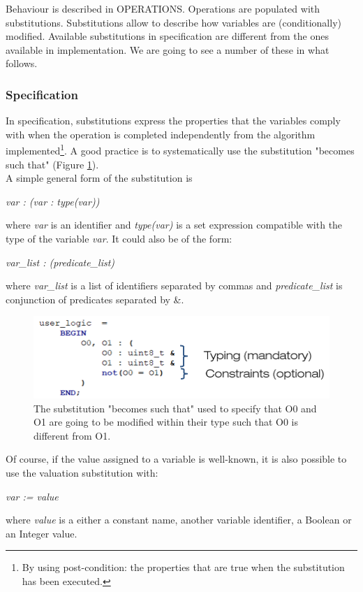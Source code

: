 Behaviour is described in OPERATIONS. Operations are populated with substitutions. Substitutions allow to describe how variables are (conditionally) modified. Available substitutions in specification are different from the ones available in implementation. We are going to see a number of these in what follows.

\subsubsection{Specification}

In specification, substitutions express the properties that the variables comply with  when the operation is completed independently from  the algorithm implemented\footnote{By using post-condition: the properties that are true when the substitution has been executed.}. A good practice is to systematically use the substitution "becomes such that" (Figure \ref{programming:subst-becomes-such-that}).\\ A simple general form of the substitution is 
\begin{center}
\textit{var : (var : type(var))}    
\end{center} where \textit{var} is an identifier and \textit{type(var)} is a set expression compatible with the type of the variable \textit{var}. It could  also be of the form:
\begin{center}
\textit{var\_list : (predicate\_list)}    
\end{center} where \textit{var\_list} is a list of identifiers separated by commas and \textit{predicate\_list} is conjunction of predicates separated by \&.
\begin{figure}[ht]
\centering\includegraphics[scale=0.30]{Pictures/chapterProgramming/subst-becomes-such-that.png}
\caption{The substitution "becomes such that" used to specify that O0 and O1 are going to be modified within their type such that O0 is different from O1. }
\label{programming:subst-becomes-such-that}
\end{figure}  
Of course, if the value assigned to a variable is well-known, it is also possible to use the valuation substitution with:
\begin{center}
\textit{var := value}    
\end{center} where \textit{value} is a either a constant name, another variable identifier, a Boolean or an Integer value.\\

